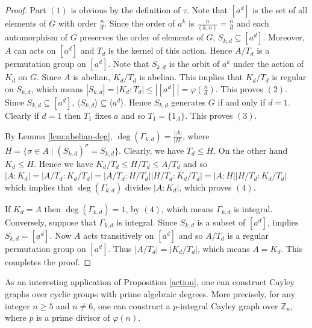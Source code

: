 \documentclass[12pt,a4paper]{article}
\def \leq {\leqslant}
\def \geq {\geqslant}
\begin{document}
	\begin{proof}
		Part $(1)$ is obvious by the definition of $\tau$. 
		Note that $[a^d]$ is the set of all elements of $G$ with order $\frac{n}{d}$.
		Since the order of $a^k$ is $\frac{n}{(k,n)}=\frac{n}{d}$ and each automorphism of $G$ preserves the order of elements of $G$, $S_{k,d}\subseteq [a^d]$.
		Moreover, $A$ can acts on $[a^d]$ and $T_d$ is the kernel of this action.
		Hence $A/T_d$ is a permutation group on $[a^d]$. 
		Note that $S_{k,d}$ is the orbit of $a^k$ under the action of $K_d$ on $G$. 
		Since $A$ is abelian, $K_d/T_d$ is abelian. This implies that $K_d/T_d$ is regular on $S_{k,d}$, which means $|S_{k,d}|=|K_d:T_d|\leq |[a^d]|=\varphi(\frac{n}{d})$. This proves $(2)$. 
		Since $S_{k,d}\subseteq [a^d]$, $\langle S_{k,d}\rangle \subseteq\langle a^d\rangle$. Hence
		$S_{k,d}$ generates $G$ if and only if $d=1$. Clearly if $d=1$ then $T_1$ fixes $a$ and so $T_1=\{1_A\}$. This proves $(3)$.
		
		By Lemma \ref{lem:abelian-deg}, $\deg(\Gamma_{k,d})=\frac{|A|}{|H|}$, where $H=\{\sigma\in A\mid (S_{k,d})^\sigma=S_{k,d}\}$. Clearly, we have $T_d\leq H$. On the other hand $K_d\leq H$. Hence we have $K_d/T_d\leq H/T_d\leq A/T_d$ and so $|A:K_d|=|A/T_d:K_d/T_d|=|A/T_d:H/T_d||H/T_d:K_d/T_d|=|A:H||H/T_d:K_d/T_d|$ which implies that $\deg(\Gamma_{k,d})$ divides $|A:K_d|$, which proves $(4)$.
		
		If $K_d=A$ then $\deg(\Gamma_{k,d})=1$, by $(4)$, which means $\Gamma_{k,d}$  is integral. Conversely, suppose that $\Gamma_{k,d}$ is integral. Since $S_{k,d}$ is a subset of $[a^d]$, \cite[Theorem 7.1]{So} implies $S_{k,d}=[a^d]$. Now $A$ acts transitively on $[a^d]$ and so $A/T_d$ is a regular permutation group on $[a^d]$. Thus $|A/T_d|=|K_d/T_d|$, which means
		$A=K_d$. This completes the proof.
	\end{proof}
	
	As an interesting application of Proposition \ref{action}, one can construct Cayley graphs over cyclic groups with prime algebraic degrees.
	More precisely, for any integer $n\geq 5$ and $n\neq 6$, one can construct a $p$-integral Cayley graph over $\mathbb Z_n$, where $p$ is a prime divisor of $\varphi(n)$. %
	
\end{document}

